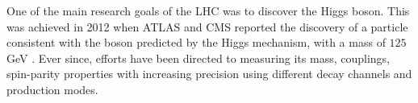 
One of the main research goals of the LHC was to discover the Higgs boson. This was achieved in 2012 when ATLAS and CMS reported the discovery of a particle consistent with the boson predicted by the Higgs mechanism, with a mass of $125$ GeV \cite{higgsDiscoveryATLAS,higgsDiscoveryCMS}. Ever since, efforts have been directed to measuring its mass, couplings, spin-parity properties with increasing precision using different decay channels and production modes. 


